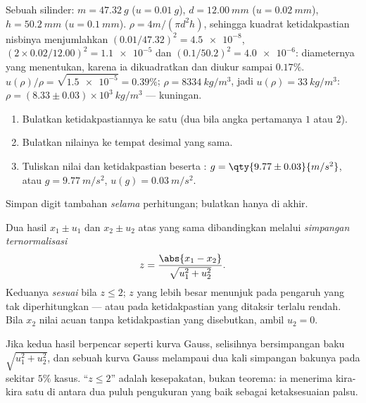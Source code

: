\begin{example}\label{ex:b1:units-dimensions:density}
Sebuah silinder: $m = \qty{47.32}{g}$ ($u = \qty{0.01}{g}$),
$d = \qty{12.00}{mm}$ ($u = \qty{0.02}{mm}$), $h = \qty{50.2}{mm}$
($u = \qty{0.1}{mm}$). $\rho = 4m/(\pi d^2 h)$, sehingga kuadrat
ketidakpastian nisbinya menjumlahkan $(0.01/47.32)^2 = \num{4.5e-8}$,
$(2 \times 0.02/12.00)^2 = \num{1.1e-5}$ dan
$(0.1/50.2)^2 = \num{4.0e-6}$: diameternya yang menentukan, karena ia
dikuadratkan dan diukur sampai $0.17\%$. $u(\rho)/\rho = \sqrt{\num{1.5e-5}}
= 0.39\%$; $\rho = \qty{8334}{kg/m^3}$, jadi $u(\rho) = \qty{33}{kg/m^3}$:
$\rho = (8.33 \pm 0.03)\times10^3\ \unit{kg/m^3}$ --- kuningan.
\end{example}

\begin{method}\label{met:b1:units-dimensions:writing}
\begin{enumerate}
  \item Bulatkan ketidakpastiannya ke satu  (dua bila
        angka pertamanya $1$ atau $2$).
  \item Bulatkan nilainya ke tempat desimal yang sama.
  \item Tuliskan nilai dan ketidakpastian beserta :
        $g = \qty{9.77\pm0.03}{m/s^2}$, atau $g = \qty{9.77}{m/s^2}$,
        $u(g) = \qty{0.03}{m/s^2}$.
\end{enumerate}
Simpan digit tambahan \emph{selama} perhitungan; bulatkan hanya di akhir.
\end{method}

\begin{definition}\label{def:b1:units-dimensions:zscore}
Dua hasil $x_1 \pm u_1$ dan $x_2 \pm u_2$ atas  yang sama
dibandingkan melalui \emph{simpangan ternormalisasi}
\[
z = \frac{\abs{x_1 - x_2}}{\sqrt{u_1^2 + u_2^2}} .
\]
Keduanya \emph{sesuai} bila $z \leq 2$; $z$ yang lebih besar menunjuk
pada pengaruh yang tak diperhitungkan --- atau pada ketidakpastian yang
ditaksir terlalu rendah. Bila $x_2$ nilai acuan tanpa ketidakpastian
yang disebutkan, ambil $u_2 = 0$.
\end{definition}

\begin{remark}[Mengapa 2]\label{rem:b1:units-dimensions:why2}
Jika kedua hasil berpencar seperti kurva Gauss, selisihnya bersimpangan
baku $\sqrt{u_1^2 + u_2^2}$, dan sebuah kurva Gauss melampaui dua kali
simpangan bakunya pada sekitar $5\%$ kasus. ``$z \leq 2$'' adalah
kesepakatan, bukan teorema: ia menerima kira-kira satu di antara dua
puluh pengukuran yang baik sebagai ketaksesuaian palsu.
\end{remark}

